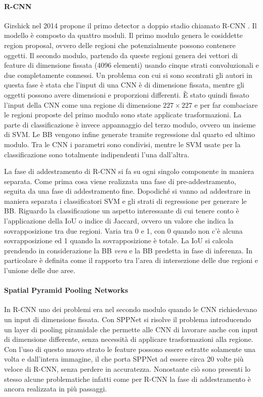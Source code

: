\paragraph{R-CNN} 
Girshick nel 2014 propone il primo detector a doppio stadio chiamato R-CNN \cite{girshick2014rich}. Il modello è composto da quattro moduli. Il primo modulo genera le cosiddette region proposal, ovvero delle regioni che potenzialmente possono contenere oggetti. Il secondo modulo, partendo da queste regioni genera dei vettori di feature di dimensione fissata (4096 elementi) usando cinque strati convoluzionali e due completamente connessi. Un problema con cui si sono scontrati gli autori in questa fase è stata che l'input di una \ac{CNN} è di dimensione fissata, mentre gli oggetti possono avere dimensioni e proporzioni differenti. È stato quindi fissato l'input della \ac{CNN} come una regione di dimensione $227 \times 227$ e per far combaciare le regioni proposte del primo modulo sono state applicate trasformazioni.
La parte di classificazione è invece appannaggio del terzo modulo, ovvero  un insieme di \ac{SVM}. Le \ac{BB} vengono infine generate tramite regressione dal quarto ed ultimo modulo. Tra le \ac{CNN} i parametri sono condivisi, mentre le \ac{SVM} usate per la classificazione sono totalmente indipendenti l'una dall'altra.

La fase di addestramento di R-CNN si fa su ogni singolo componente in maniera separata. Come prima cosa viene realizzata una fase di pre-addestramento, seguita da una fase di addestramento fine. Dopodiché si vanno ad addestrare in maniera separata i classificatori \ac{SVM} e gli strati di regressione per generare le \ac{BB}.
Riguardo la classificazione un aspetto interessante di cui tenere conto è l'applicazione della \ac{IoU} o indice di Jaccard, ovvero un valore che indica la sovrapposizione tra due regioni. Varia tra 0 e 1, con 0 quando non c'è alcuna sovrapposizione ed 1 quando la sovrapposizione è totale. La \ac{IoU} si calcola prendendo in considerazione la \ac{BB} \textit{vera} e la \ac{BB} predetta in fase di inferenza. In particolare è definita come il rapporto tra l'area di intersezione delle due regioni e l'unione delle due aree. 

\paragraph{Spatial Pyramid Pooling Networks} In R-CNN uno dei problemi era nel secondo modulo quando le \ac{CNN} richiedevano un input di dimensione fissata. Con \ac{SPPNet} \cite{he2015spatial} si risolve il problema introducendo un layer di pooling piramidale che permette alle \ac{CNN} di lavorare anche con input di dimensione differente, senza necessità di applicare trasformazioni alla regione.
Con l'uso di questo nuovo strato le feature possono essere estratte solamente una volta e dall'intera immagine, il che porta \ac{SPPNet} ad essere circa 20 volte più veloce di R-CNN, senza perdere in accuratezza. 
Nonostante ciò sono presenti lo stesso alcune problematiche infatti come per R-CNN la fase di addestramento è ancora realizzata in più passaggi.

